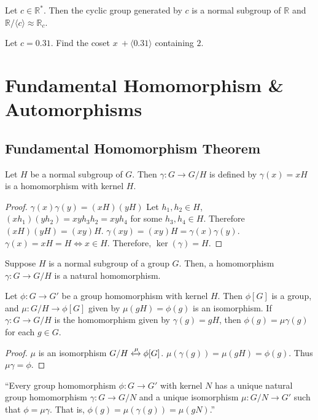 \begin{remark}
	Let $c \in \mathbb{R}^*$.
	Then the cyclic group generated by $c$ is
	a normal subgroup of $\mathbb{R}$ and $\mathbb{R}/\langle c \rangle \approx \mathbb{R}_c$.
\end{remark}

\begin{question}
	Let $c = 0.31$.
	Find the coset $x\ +\langle 0.31 \rangle $ containing $2$.
\end{question}

\section{Fundamental Homomorphism \& Automorphisms}
\subsection{Fundamental Homomorphism Theorem}
\begin{theorem}
	Let $H$ be a normal subgroup of $G$.
	Then $\gamma : G \to G/H$ is defined by
	$\gamma(x) = xH$  is a homomorphism with kernel $H$.
\end{theorem}
\begin{proof}
	$\gamma(x)\gamma(y) = (xH)(yH)$
	Let $h_1,h_2 \in H$, $(xh_1)(yh_2) = xyh_3h_2 = xyh_4$ for some $h_3,h_4 \in H$.
	Therefore $(xH)(yH) = (xy)H$.
	$\gamma(xy) = (xy)H = \gamma(x)\gamma(y)$.
	$\gamma(x) = xH = H \iff x \in H$.
	Therefore, $\ker(\gamma) = H$.
\end{proof}

\begin{remark}
	Suppose $H$ is a normal subgroup of a group $G$.
	Then, a homomorphism $\gamma : G \to G/H$ is a natural homomorphism.
\end{remark}

\begin{theorem}
	Let $\phi : G \to G'$ be a group homomorphism with kernel $H$.
	Then $\phi[G]$ is a group, and $\mu : G/H \to \phi[G]$ given by $\mu(gH) = \phi(g)$ is an isomorphism.
	If $\gamma : G \to G/H$ is the homomorphism given by $\gamma(g) = gH$, then $\phi(g) = \mu\gamma(g)$ for each $g \in G$.
\end{theorem}
\begin{proof}
	$\mu$ is an isomorphism $G/H \xleftrightarrow{\mu}\phi[G]$.
	$\mu(\gamma(g)) = \mu(gH) = \phi(g)$.
	Thus $\mu\gamma = \phi$.
\end{proof}
\begin{commentary}
	``Every group homomorphism $\phi : G \to G'$ with kernel $N$ has a unique natural group homomorphism $\gamma : G \to G/N$ and a unique isomorphism $\mu : G/N \to G'$ such that $\phi = \mu\gamma$. That is, $\phi(g) = \mu(\gamma(g)) = \mu(gN)$.''
\end{commentary}


